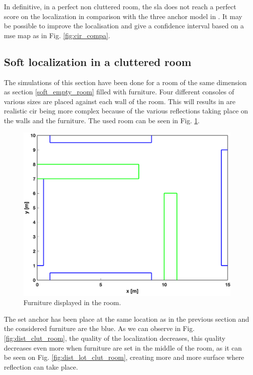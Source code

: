 In definitive, in a perfect non cluttered room, the \gls{sla} does not reach a perfect score on the localization in comparison with the three anchor model in \cite{hannotier2019indoor}. It may be possible to improve the localisation and give a confidence interval based on a \gls{mse} map as in Fig. \ref{fig:cir_compa}.

\subsection{Soft localization in a cluttered room}

The simulations of this section have been done for a room of the same dimension as section \ref{soft_empty_room} filled with furniture. Four different consoles of various sizes are placed against each wall of the room. This will results in are realistic \gls{cir} being more complex because of the various reflections taking place on the walls and the furniture. The used room can be seen in Fig. \ref{fig:room_cluttered}.

\begin{figure}[H]
\centering
\includegraphics[width=.6\linewidth]{Images/room_furniture.png}
\caption{Furniture displayed in the room. \label{fig:room_cluttered}}
\end{figure}


The set anchor has been place at the same location as in the previous section and the considered furniture are the blue. As we can observe in Fig. \ref{fig:dist_clut_room}, the quality of the localization decreases, this quality decreases even more when furniture are set in the middle of the room, as it can be seen on Fig. \ref{fig:dist_lot_clut_room}, creating more and more surface where reflection can take place.


